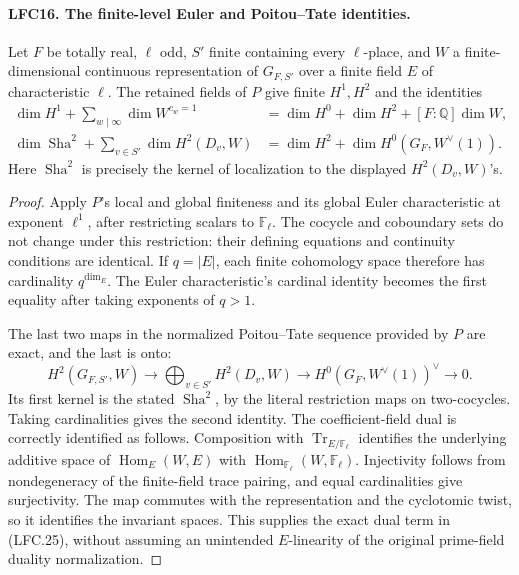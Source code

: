 \paragraph{LFC16. The finite-level Euler and Poitou--Tate identities.}
\label{claim:LFC16}
Let \(F\) be totally real, \(\ell\) odd,
\(S'\) finite containing every \(\ell\)-place, and \(W\)
a finite-dimensional continuous representation of
\(G_{F,S'}\) over a finite field \(E\) of characteristic
\(\ell\).  The retained fields of \(P\) give finite
\(H^1,H^2\) and the identities
\[
 \begin{split}
 \dim H^1+\sum_{w\mid\infty}\dim W^{c_w=1}
   &=\dim H^0+\dim H^2+[F:\mathbb Q]\dim W,\\
 \dim\operatorname{Sha}^2+\sum_{v\in S'}\dim H^2(D_v,W)
   &=\dim H^2+\dim H^0(G_F,W^\vee(1)).
 \end{split}                                           \tag{LFC.25}
\]
Here \(\operatorname{Sha}^2\) is precisely the kernel of localization
to the displayed \(H^2(D_v,W)\)'s.

\begin{proof}
Apply \(P\)'s local and global finiteness and its global
Euler characteristic at exponent \(\ell^1\), after
restricting scalars to \(\mathbb F_\ell\).
The cocycle and coboundary sets do not change under this
restriction: their defining equations and continuity
conditions are identical.  If \(q=|E|\), each finite
cohomology space therefore has cardinality \(q^{\dim_E}\).
The Euler characteristic's cardinal identity becomes
the first equality after taking exponents of \(q>1\).

The last two maps in the normalized Poitou--Tate sequence
provided by \(P\) are exact, and the last is onto:
\[
 H^2(G_{F,S'},W)\longrightarrow
 \bigoplus_{v\in S'}H^2(D_v,W)
       \longrightarrow H^0(G_F,W^\vee(1))^\vee
       \longrightarrow0.
 \]
Its first kernel is the stated \(\operatorname{Sha}^2\), by the
literal restriction maps on two-cocycles.
Taking cardinalities gives the second identity.
The coefficient-field dual is correctly identified as
follows.  Composition with
\(\operatorname{Tr}_{E/\mathbb F_\ell}\) identifies the
underlying additive space of \(\operatorname{Hom}_E(W,E)\)
with \(\operatorname{Hom}_{\mathbb F_\ell}(W,\mathbb F_\ell)\).
Injectivity follows from nondegeneracy of the finite-field
trace pairing, and equal cardinalities give surjectivity.
The map commutes with the representation and the
cyclotomic twist, so it identifies the invariant spaces.
This supplies the exact dual term in (LFC.25), without
assuming an unintended \(E\)-linearity of the original
prime-field duality normalization.
\end{proof}

